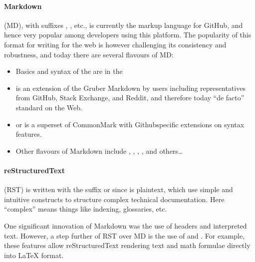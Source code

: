 \documentclass[a4paper,12pt,english]{sphinxhowto}
\begin{document}
\paragraph{Markdown}
\label{\detokenize{DDHH:markdown}}
 (MD), with suffixes , , etc., is currently the markup language for GitHub,
and hence very popular among developers using this platform. The popularity of this format for writing
for the web is however challenging its consistency and robustness, and today there are several flavours of MD:
\begin{itemize}
\item {} 
Basics and syntax of the  are in the 

\item {} 
 is an extension of the Gruber Markdown by users including representatives from GitHub, Stack Exchange, and Reddit, and therefore today “de facto” standard on the Web.

\item {} 
 or  is a superset of CommonMark with Github\sphinxhyphen{}specific extensions on syntax features.

\item {} 
Other flavours of Markdown include , , , , and others…

\end{itemize}



\paragraph{reStructuredText}
\label{\detokenize{DDHH:restructuredtext}}
 (RST) is written with the suffix  or  since is plaintext, which use simple and intuitive
constructs to structure complex technical documentation. Here “complex” means things like indexing, glossaries, etc.

One significant innovation of Markdown was the use of headers and interpreted text. However, a step further
of RST over MD is the use of  and . For example, these features allow reStructuredText
rendering text and math formulae directly into LaTeX format.
\end{document}
